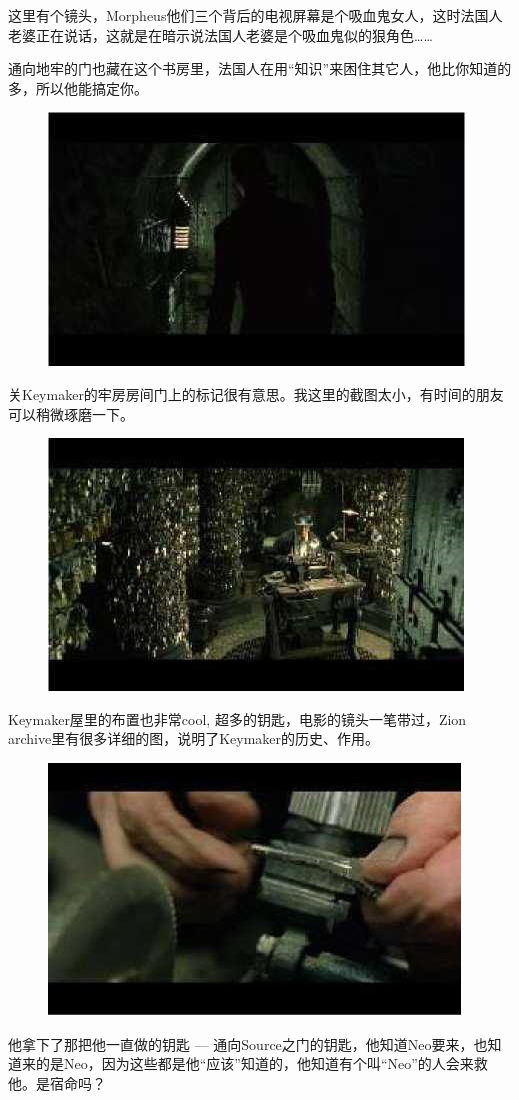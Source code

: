 \documentclass[UTF8]{ctexart}
\begin{document}
这里有个镜头，Morpheus他们三个背后的电视屏幕是个吸血鬼女人，这时法国人老婆正在说话，这就是在暗示说法国人老婆是个吸血鬼似的狠角色……

通向地牢的门也藏在这个书房里，法国人在用“知识”来困住其它人，他比你知道的多，所以他能搞定你。

\begin{figure}[htb]
\centering
\includegraphics[width=0.5\linewidth]{fig/read_reloaded-114}
\end{figure}

关Keymaker的牢房房间门上的标记很有意思。我这里的截图太小，有时间的朋友可以稍微琢磨一下。

\begin{figure}[htb]
\centering
\includegraphics[width=0.5\linewidth]{fig/read_reloaded-115}
\end{figure}

Keymaker屋里的布置也非常cool, 超多的钥匙，电影的镜头一笔带过，Zion archive里有很多详细的图，说明了Keymaker的历史、作用。

\begin{figure}[htb]
\centering
\includegraphics[width=0.5\linewidth]{fig/read_reloaded-115-1}
\end{figure}

他拿下了那把他一直做的钥匙 --- 通向Source之门的钥匙，他知道Neo要来，也知道来的是Neo，因为这些都是他“应该”知道的，他知道有个叫“Neo”的人会来救他。是宿命吗？
\end{document}
